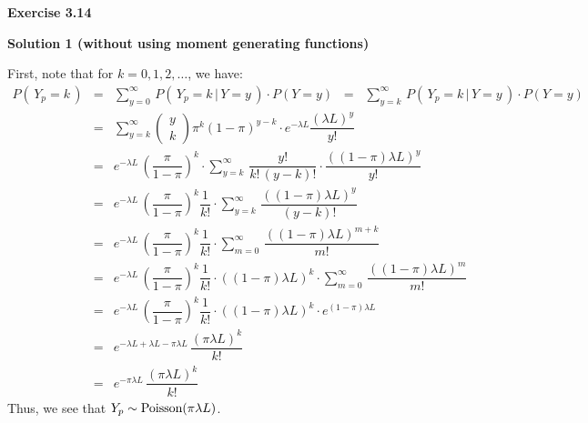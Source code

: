 
\noindent
\textbf{Exercise 3.14}

\vskip 0.3cm
\noindent
\textbf{Solution 1 (without using moment generating functions)}

\vskip 0.3cm
\noindent
First, note that for $k = 0, 1, 2, \ldots$, we have:
\begin{eqnarray*}
          P(\,Y_{p} = k\,)
&=&       \sum_{y=0}^{\infty}\,P(\,Y_{p} = k\,\vert\,Y=y\,)\cdot P(Y = y)
\;\;=\;\; \sum_{y=k}^{\infty}\,P(\,Y_{p} = k\,\vert\,Y=y\,)\cdot P(Y = y)
\\
&=&       \sum_{y=k}^{\infty}
          \left(\!\begin{array}{c} y \\ k \end{array}\!\right)
          \pi^{k} (1 - \pi)^{y-k} \cdot e^{-\lambda L} \dfrac{(\lambda L)^{y}}{y!}
\\
&=&
          e^{-\lambda L}\,\left(\dfrac{\pi}{1-\pi}\right)^{k}\cdot
          \sum_{y=k}^{\infty}\,
          \dfrac{y!}{k!\,(y-k)!}\cdot\dfrac{((1-\pi)\lambda L)^{y}}{y!}
\\
&=&
          e^{-\lambda L}\,\left(\dfrac{\pi}{1-\pi}\right)^{k}\dfrac{1}{k!}
          \cdot
          \sum_{y=k}^{\infty}\,\dfrac{((1-\pi)\lambda L)^{y}}{(y-k)!}
\\
&=&
          e^{-\lambda L}\,\left(\dfrac{\pi}{1-\pi}\right)^{k}\dfrac{1}{k!}
          \cdot
          \sum_{m=0}^{\infty}\,\dfrac{((1-\pi)\lambda L)^{m+k}}{m!}
\\
&=&
          e^{-\lambda L}\,\left(\dfrac{\pi}{1-\pi}\right)^{k}\dfrac{1}{k!}
          \cdot
          ((1-\pi)\lambda L)^{k}
          \cdot
          \sum_{m=0}^{\infty}\,\dfrac{((1-\pi)\lambda L)^{m}}{m!}
\\
&=&
          e^{-\lambda L}\,\left(\dfrac{\pi}{1-\pi}\right)^{k}\dfrac{1}{k!}
          \cdot
          ((1-\pi)\lambda L)^{k}
          \cdot e^{(1-\pi)\lambda L}
\\
&=&       e^{-\lambda L+\lambda L - \pi\lambda L}\,\dfrac{\left(\pi\lambda L\right)^{k}}{k!}
\\
&=&       e^{-\pi\lambda L}\,\dfrac{\left(\pi\lambda L\right)^{k}}{k!}
\end{eqnarray*}
Thus, we see that $Y_{p} \sim \textnormal{Poisson}(\pi\lambda L)$.


